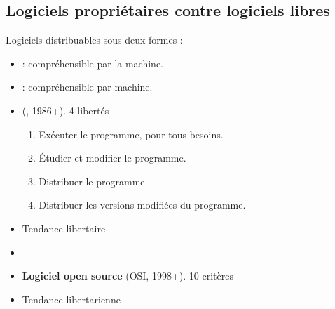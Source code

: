 \subsection{Logiciels propriétaires contre logiciels libres} %

\begin{frame}
	Logiciels distribuables sous deux formes :
	\begin{itemize}
		\item {} : compréhensible par la machine.
		\item {} : compréhensible par machine.
	\end{itemize}

\end{frame}

\begin{frame}
	\begin{itemize}
		\item {} (, 1986+). 4 libertés
		\begin{enumerate}[start=0]
			\item Exécuter le programme, pour tous besoins.
			\item Étudier et modifier le programme.
			\item Distribuer le programme.
			\item Distribuer les versions modifiées du programme.
		\end{enumerate}
		\item Tendance libertaire
		\item 
	\end{itemize}

\end{frame} 

\begin{frame}
	\begin{itemize}
		\item \textbf{Logiciel open source} (OSI, 1998+). 10 critères
		\item Tendance libertarienne
	\end{itemize}
\end{frame}

